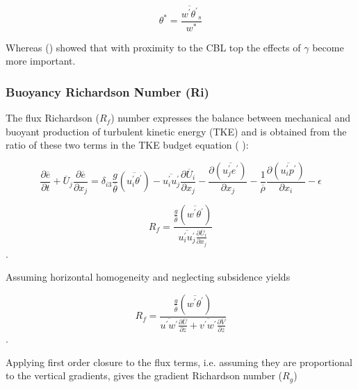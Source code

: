 \begin{equation}
\theta^{*} = \frac{\overline{w^{'}\theta^{'}}_{s}}{w^{*}}
\end{equation} 

Whereas \citeauthor{Sorbjan} (\citeyear{Sorbjan}) showed that with proximity to the \acs{CBL} top the effects of $\gamma$ become more important.
 
\subsubsection{Buoyancy Richardson Number (\acs{Ri})}
\label{subsubsec:}

The flux Richardson ($R_{f}$) number expresses the balance between mechanical and buoyant production of turbulent kinetic energy (\acs{TKE}) and is obtained from the ratio of these two terms in the \acs{TKE} budget equation (\citeauthor{Stull-BLMetIntro} \citeyear{Stull-BLMetIntro}):

\begin{equation}
\frac{\partial \overline{e}}{\partial t} + \overline{U}_{j} \frac{\partial \overline{e}}{\partial x_{j}} = \delta_{i3}  \frac{g}{\overline{\theta}} \left( \overline{u_{i}^{'}\theta^{'}} \right) - \overline{u_{i}^{'}u_{j}^{'}}\frac{\partial \overline{U}_{i}}{\partial x_{j}} - \frac{ \partial \left( \overline{u_{j}^{'}e^{'}} \right)}{\partial x_{j}} - \frac{1}{\overline{\rho}} \frac{\partial \left( \overline{u_{i}^{'} p^{'}} \right) }{\partial x_{i}} - \epsilon
\end{equation}

\begin{equation}
R_{f} = \frac{\frac{g}{\overline{\theta}} \left( \overline{w^{'}\theta^{'}} \right)}{\overline{u_{i}^{'}u_{j}^{'}}\frac{\partial \overline{U}_{i}}{\partial x_{j}}}
\end{equation}.
 
Assuming horizontal homogeneity and neglecting subsidence yields
  
\begin{equation}
R_{f} = \frac{\frac{g}{\overline{\theta}} \left( \overline{w^{'}\theta^{'}} \right)}{\overline{u^{'}w^{'}}\frac{\partial \overline{U}}{\partial z} + \overline{v^{'}w^{'}}\frac{\partial \overline{V}}{\partial z}}
\end{equation}.

Applying first order closure to the flux terms, i.e. assuming they are proportional to the vertical gradients, gives the gradient Richardson number ($R_{g}$)

